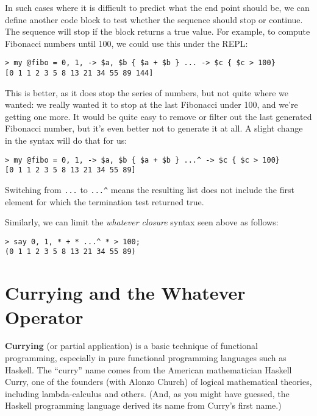 In such cases where it is difficult to predict what the end 
point should be, we can define another code block to test 
whether the sequence should stop or continue. The sequence 
will stop if the block returns a true value. For example, 
to compute Fibonacci numbers until 100, we could use this 
under the REPL:

\begin{verbatim}
> my @fibo = 0, 1, -> $a, $b { $a + $b } ... -> $c { $c > 100}
[0 1 1 2 3 5 8 13 21 34 55 89 144]
\end{verbatim}

This is better, as it does stop the series of numbers, but 
not quite where we wanted: we really wanted it to stop at the last 
Fibonacci under 100, and we're getting one more. It would be 
quite easy to remove or filter out the last generated Fibonacci 
number, but it's even better not to generate it at all. A slight 
change in the syntax will do that for us:

\begin{verbatim}
> my @fibo = 0, 1, -> $a, $b { $a + $b } ...^ -> $c { $c > 100}
[0 1 1 2 3 5 8 13 21 34 55 89]
\end{verbatim}

Switching from \verb'...' to \verb'...^' means the 
resulting list does not include the first element 
for which the termination test returned true.

Similarly, we can limit the \emph{whatever closure} 
syntax seen above as follows:

\begin{verbatim}
> say 0, 1, * + * ...^ * > 100;
(0 1 1 2 3 5 8 13 21 34 55 89)
\end{verbatim}

\section{Currying and the Whatever Operator}

{\bf Currying} (or partial application) is a basic technique 
of functional programming, especially in pure functional 
programming languages such as Haskell. The ``curry'' name comes 
from the American mathematician Haskell Curry, one of the 
founders (with Alonzo Church) of logical mathematical 
theories, including lambda-calculus and others. (And, as 
you might have guessed, the Haskell programming language 
derived its name from Curry's first name.)

